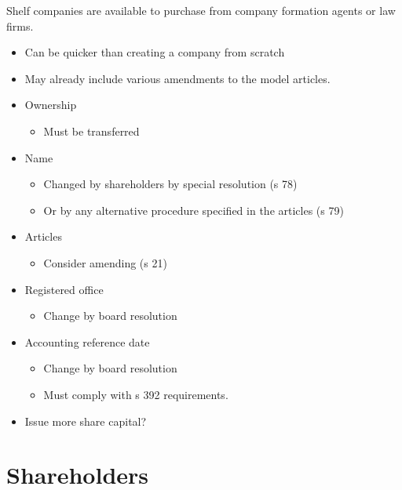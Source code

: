 \documentclass[
]{article}
\providecommand{\tightlist}{%
  \setlength{\itemsep}{0pt}\setlength{\parskip}{0pt}}
\begin{document}
Shelf companies are available to purchase from company formation agents
or law firms.

\begin{itemize}
\tightlist
\item
  Can be quicker than creating a company from scratch
\item
  May already include various amendments to the model articles.
\item
  Ownership

  \begin{itemize}
  \tightlist
  \item
    Must be transferred
  \end{itemize}
\item
  Name

  \begin{itemize}
  \tightlist
  \item
    Changed by shareholders by special resolution (s 78)
  \item
    Or by any alternative procedure specified in the articles (s 79)
  \end{itemize}
\item
  Articles

  \begin{itemize}
  \tightlist
  \item
    Consider amending (s 21)
  \end{itemize}
\item
  Registered office

  \begin{itemize}
  \tightlist
  \item
    Change by board resolution
  \end{itemize}
\item
  Accounting reference date

  \begin{itemize}
  \tightlist
  \item
    Change by board resolution
  \item
    Must comply with s 392 requirements.
  \end{itemize}
\item
  Issue more share capital?
\end{itemize}

\hypertarget{shareholders}{%
\section{Shareholders}\label{shareholders}}
\end{document}

